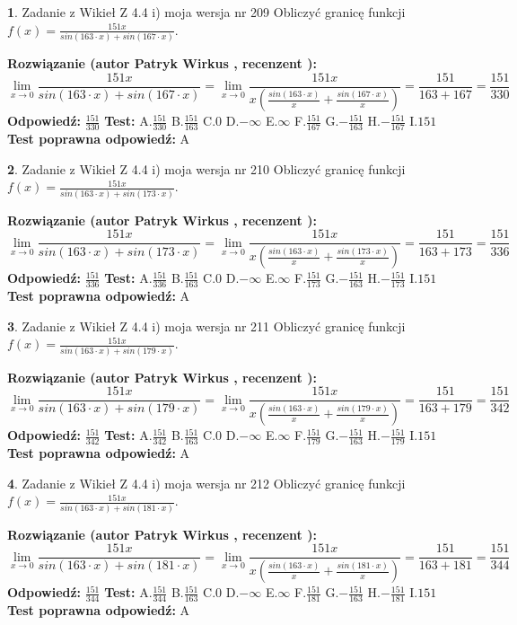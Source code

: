 \documentclass[12pt, a4paper]{article}
\theoremstyle{definition} %
\newtheorem{zad}{}
\newcommand{\zadStart}[1]{\begin{zad}#1\newline}
\newcommand{\zadStop}{\end{zad}}
\newcommand{\rozwStart}[2]{\noindent \textbf{Rozwiązanie (autor #1 , recenzent #2): }\newline}
\newcommand{\rozwStop}{\newline}
\newcommand{\odpStart}{\noindent \textbf{Odpowiedź:}\newline}
\newcommand{\odpStop}{\newline}
\newcommand{\testStart}{\noindent \textbf{Test:}\newline}
\newcommand{\testStop}{\newline}
\newcommand{\kluczStart}{\noindent \textbf{Test poprawna odpowiedź:}\newline}
\newcommand{\kluczStop}{\newline}
\begin{document}
\zadStart{Zadanie z Wikieł Z 4.4 i) moja wersja nr 209}
Obliczyć granicę funkcji $f(x)=\frac{151x}{sin(163\cdot x) +sin(167\cdot x)}$.
\zadStop
\rozwStart{Patryk Wirkus}{}
$$\lim\limits_{x\to 0}\frac{151x}{sin(163\cdot x) +sin(167\cdot x)}=\lim\limits_{x\to 0}\frac{151x}{x(\frac{sin(163\cdot x)}{x}+\frac{sin(167\cdot x)}{x})}=\frac{151}{163+167} = \frac{151}{330}$$
\rozwStop
\odpStart
$\frac{151}{330}$
\odpStop
\testStart
A.$\frac{151}{330}$
B.$\frac{151}{163}$
C.$0$
D.$-\infty$
E.$\infty$
F.$\frac{151}{167}$
G.$-\frac{151}{163}$
H.$-\frac{151}{167}$
I.$151$
\testStop
\kluczStart
A
\kluczStop



\zadStart{Zadanie z Wikieł Z 4.4 i) moja wersja nr 210}
Obliczyć granicę funkcji $f(x)=\frac{151x}{sin(163\cdot x) +sin(173\cdot x)}$.
\zadStop
\rozwStart{Patryk Wirkus}{}
$$\lim\limits_{x\to 0}\frac{151x}{sin(163\cdot x) +sin(173\cdot x)}=\lim\limits_{x\to 0}\frac{151x}{x(\frac{sin(163\cdot x)}{x}+\frac{sin(173\cdot x)}{x})}=\frac{151}{163+173} = \frac{151}{336}$$
\rozwStop
\odpStart
$\frac{151}{336}$
\odpStop
\testStart
A.$\frac{151}{336}$
B.$\frac{151}{163}$
C.$0$
D.$-\infty$
E.$\infty$
F.$\frac{151}{173}$
G.$-\frac{151}{163}$
H.$-\frac{151}{173}$
I.$151$
\testStop
\kluczStart
A
\kluczStop



\zadStart{Zadanie z Wikieł Z 4.4 i) moja wersja nr 211}
Obliczyć granicę funkcji $f(x)=\frac{151x}{sin(163\cdot x) +sin(179\cdot x)}$.
\zadStop
\rozwStart{Patryk Wirkus}{}
$$\lim\limits_{x\to 0}\frac{151x}{sin(163\cdot x) +sin(179\cdot x)}=\lim\limits_{x\to 0}\frac{151x}{x(\frac{sin(163\cdot x)}{x}+\frac{sin(179\cdot x)}{x})}=\frac{151}{163+179} = \frac{151}{342}$$
\rozwStop
\odpStart
$\frac{151}{342}$
\odpStop
\testStart
A.$\frac{151}{342}$
B.$\frac{151}{163}$
C.$0$
D.$-\infty$
E.$\infty$
F.$\frac{151}{179}$
G.$-\frac{151}{163}$
H.$-\frac{151}{179}$
I.$151$
\testStop
\kluczStart
A
\kluczStop



\zadStart{Zadanie z Wikieł Z 4.4 i) moja wersja nr 212}
Obliczyć granicę funkcji $f(x)=\frac{151x}{sin(163\cdot x) +sin(181\cdot x)}$.
\zadStop
\rozwStart{Patryk Wirkus}{}
$$\lim\limits_{x\to 0}\frac{151x}{sin(163\cdot x) +sin(181\cdot x)}=\lim\limits_{x\to 0}\frac{151x}{x(\frac{sin(163\cdot x)}{x}+\frac{sin(181\cdot x)}{x})}=\frac{151}{163+181} = \frac{151}{344}$$
\rozwStop
\odpStart
$\frac{151}{344}$
\odpStop
\testStart
A.$\frac{151}{344}$
B.$\frac{151}{163}$
C.$0$
D.$-\infty$
E.$\infty$
F.$\frac{151}{181}$
G.$-\frac{151}{163}$
H.$-\frac{151}{181}$
I.$151$
\testStop
\kluczStart
A
\kluczStop
\end{document}
